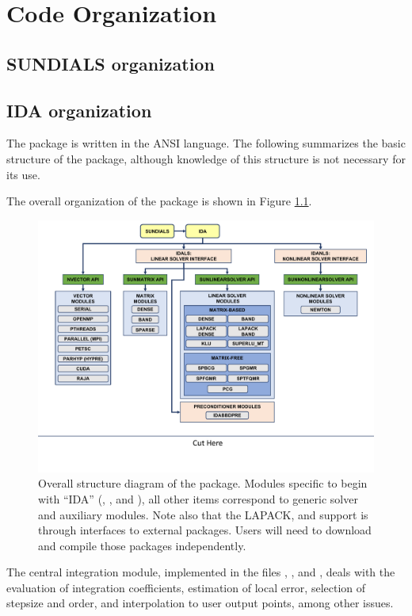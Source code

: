 \chapter{Code Organization}\label{s:organization}

\section{SUNDIALS organization}\label{ss:sun_org}


\section{IDA organization}\label{ss:ida_org}

The {\ida} package is written in the ANSI {\CC} language. The following
summarizes the basic structure of the package, although knowledge
of this structure is not necessary for its use.

The overall organization of the {\ida} package is shown in Figure
\ref{f:idaorg}.
\begin{figure}
{\centerline{\includegraphics[width=\textwidth]{idaorg}}}
\caption [Overall structure diagram of the {\ida} package]
{Overall structure diagram of the {\ida} package.
  Modules specific to {\ida} begin with ``IDA'' ({\idals},
  {\idabbdpre}, and {\idanls}), all other items correspond
  to generic solver and auxiliary modules. 
  Note also that the LAPACK, {\klu} and {\superlumt} support is
  through interfaces to external packages. 
  Users will need to download and compile those packages independently.}
\label{f:idaorg}
\end{figure}
The central integration module, implemented in the files ,
, and , deals with the evaluation of integration 
coefficients, estimation of local error,
selection of stepsize and order, and interpolation to user output
points, among other issues.

